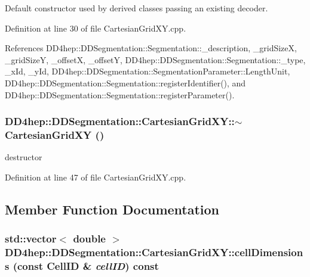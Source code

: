 Default constructor used by derived classes passing an existing decoder. 

Definition at line 30 of file CartesianGridXY.cpp.

References DD4hep::DDSegmentation::Segmentation::\_\-description, \_\-gridSizeX, \_\-gridSizeY, \_\-offsetX, \_\-offsetY, DD4hep::DDSegmentation::Segmentation::\_\-type, \_\-xId, \_\-yId, DD4hep::DDSegmentation::SegmentationParameter::LengthUnit, DD4hep::DDSegmentation::Segmentation::registerIdentifier(), and DD4hep::DDSegmentation::Segmentation::registerParameter().\hypertarget{class_d_d4hep_1_1_d_d_segmentation_1_1_cartesian_grid_x_y_aeaad4807131cbd3536718b66a0a76b0d}{
\subsubsection[{$\sim$CartesianGridXY}]{\setlength{\rightskip}{0pt plus 5cm}DD4hep::DDSegmentation::CartesianGridXY::$\sim$CartesianGridXY ()}}
\label{class_d_d4hep_1_1_d_d_segmentation_1_1_cartesian_grid_x_y_aeaad4807131cbd3536718b66a0a76b0d}


destructor 

Definition at line 47 of file CartesianGridXY.cpp.

\subsection{Member Function Documentation}
\hypertarget{class_d_d4hep_1_1_d_d_segmentation_1_1_cartesian_grid_x_y_a34189fa472ffda38fc7d865df8412ba0}{
\subsubsection[{cellDimensions}]{\setlength{\rightskip}{0pt plus 5cm}std::vector$<$ double $>$ DD4hep::DDSegmentation::CartesianGridXY::cellDimensions (const {\bf CellID} \& {\em cellID}) const}}
\label{class_d_d4hep_1_1_d_d_segmentation_1_1_cartesian_grid_x_y_a34189fa472ffda38fc7d865df8412ba0}


